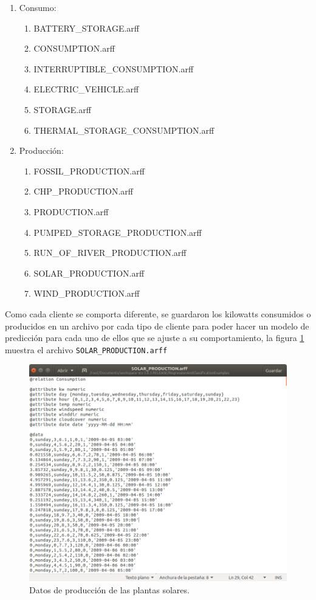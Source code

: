 \renewcommand{\labelenumi}{$\bullet$ }
\renewcommand{\labelenumii}{$\bullet$ }
\begin{enumerate}
	\item Consumo:
	\begin{enumerate}
		\item BATTERY\_STORAGE.arff
		\item CONSUMPTION.arff
		\item INTERRUPTIBLE\_CONSUMPTION.arff
		\item ELECTRIC\_VEHICLE.arff
		\item STORAGE.arff
		\item THERMAL\_STORAGE\_CONSUMPTION.arff
	\end{enumerate}
	\item Producción: 
	\begin{enumerate}
		\item FOSSIL\_PRODUCTION.arff
		\item CHP\_PRODUCTION.arff
		\item PRODUCTION.arff
		\item PUMPED\_STORAGE\_PRODUCTION.arff
		\item RUN\_OF\_RIVER\_PRODUCTION.arff
		\item SOLAR\_PRODUCTION.arff
		\item WIND\_PRODUCTION.arff
	\end{enumerate}
\end{enumerate}

Como cada cliente se comporta diferente, se guardaron los kilowatts consumidos o producidos en un archivo por cada tipo de cliente para poder hacer un modelo de predicción para cada uno de ellos que se ajuste a su comportamiento, la figura \ref{fig:datos} muestra el archivo \texttt{SOLAR\_PRODUCTION.arff} 

\begin{figure}[!t]
	\centering
	\includegraphics[width=15cm]{img/datos.png}
	\caption{Datos de producción de las plantas solares. }
	\label{fig:datos}
\end{figure}	

